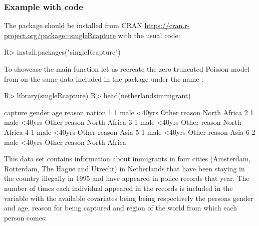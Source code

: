 \documentclass[
]{jss}
\newcommand{\1}{\mathcal{I}} \newcommand{\bZero}{\boldsymbol{0}}
\begin{document}
\subsubsection[Example with R code]{Example with 
code}\label{r-code}

The package should be installed from CRAN
\url{https://cran.r-project.org/package=singleRcapture} with the usual
code:

\begin{CodeChunk}
\begin{CodeInput}
R> install.packages("singleRcapture")
\end{CodeInput}
\end{CodeChunk}

To showcase the main function let us recreate the zero truncated Poisson
model from \cite{ztpoisson} on the same data included in the package
under the name :

\begin{CodeChunk}
\begin{CodeInput}
R> library(singleRcapture)
R> head(netherlandsimmigrant)
\end{CodeInput}
\begin{CodeOutput}
  capture gender    age       reason       nation
1       1   male <40yrs Other reason North Africa
2       1   male <40yrs Other reason North Africa
3       1   male <40yrs Other reason North Africa
4       1   male <40yrs Other reason         Asia
5       1   male <40yrs Other reason         Asia
6       2   male <40yrs Other reason North Africa
\end{CodeOutput}
\end{CodeChunk}

This data set contains information about immigrants in four cities
(Amsterdam, Rotterdam, The Hague and Utrecht) in Netherlands that have
been staying in the country illegally in 1995 and have appeared in
police records that year. The number of times each individual appeared
in the records is included in the  variable with the
available covariates being  being
respectively the persons gender and age, reason for being captured and
region of the world from which each person comes:
\end{document}
